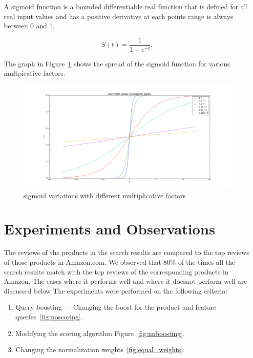 \documentclass{article}
\begin{document}
A sigmoid function is a bounded differentiable real function that is defined for all real input values and has a positive derivative at each points range is always between 0 and 1.

\begin{equation}
S(t) = \frac{1}{1 + e^{-t}}.
\end{equation}

The graph in Figure~\ref{fig:sigmoid} shows the spread of the sigmoid function for various multpicative factors.
\begin{figure}[ht!]
  \centering
  \includegraphics[width=1\textwidth]{sigmoidVariations}
  \caption{sigmoid variations with different multiplicative factors\label{fig:sigmoid}}
\end{figure}

\section{Experiments and Observations}
The reviews of the products in the search results are compared to the top reviews of those products in Amazon.com. We observed that 80\% of the times all the search results match with the top reviews of the corresponding products in Amazon. The cases where it performs well and where it doesnot perform well are discussed below
The experiments were performed on the following criteria:
\begin{enumerate}
  \item Query boosting --- Changing the boost for the product and feature queries~\ref{fig:noscoring}.
  \item Modifying the scoring algorithm Figure~\ref{fig:noboosting}.
  \item Changing the normalization weights~\ref{fig:equal_weights}.
\end{enumerate}
\end{document}
